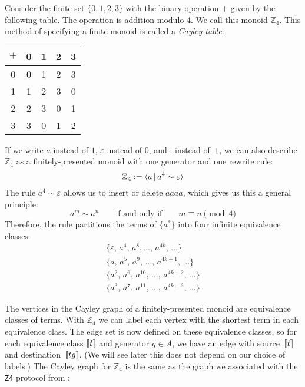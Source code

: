 \documentclass[../generics]{subfiles}
\begin{document}
\begin{example}\label{monoid z4 example}
Consider the finite set $\{0,1,2,3\}$ with the binary operation $+$ given by the following table. The operation is addition modulo 4. We call this monoid $\mathbb{Z}_4$. This method of specifying a finite monoid is called a \emph{Cayley table}:
\begin{center}
\begin{tabular}{c|cccc}
$+$&0&1&2&3\\
\hline
0&0&1&2&3\\
1&1&2&3&0\\
2&2&3&0&1\\
3&3&0&1&2
\end{tabular}
\end{center}
If we write $a$ instead of $1$, $\varepsilon$ instead of $0$, and $\cdot$ instead of $+$, we can also describe $\mathbb{Z}_4$ as a finitely-presented monoid with one generator and one rewrite rule:
\[\mathbb{Z}_4 := \langle a\,|\,a^4\sim\varepsilon\rangle\]
The rule $a^4\sim\varepsilon$ allows us to insert or delete $aaaa$, which gives us this a general principle:
\[a^m\sim a^n\qquad\text{if and only if}\qquad m\equiv n\pmod 4\]
Therefore, the rule partitions the terms of $\{a^*\}$ into four infinite equivalence classes:
\begin{gather*}
\{\varepsilon,\, a^4,\, a^8, \ldots,\, a^{4k},\, \ldots\}\\
\{a,\, a^5,\, a^9,\, \ldots,\, a^{4k+1},\, \ldots\}\\
\{a^2,\, a^6,\, a^{10},\, \ldots,\, a^{4k+2},\, \ldots\}\\
\{a^3,\, a^7,\, a^{11},\, \ldots,\, a^{4k+3},\, \ldots\}
\end{gather*}

The vertices in the Cayley graph of a finitely-presented monoid are equivalence classes of terms. With $\mathbb{Z}_4$ we can label each vertex with the shortest term in each equivalence class. The edge set is now defined on these equivalence classes, so for each equivalence class $[\![t]\!]$ and generator $g\in A$, we have an edge with source~$[\![t]\!]$ and destination~$[\![tg]\!]$. (We will see later this does not depend on our choice of labels.) The Cayley graph for $\mathbb{Z}_4$ is the same as the graph we associated with the \texttt{Z4} protocol from :


\end{example}
\end{document}
